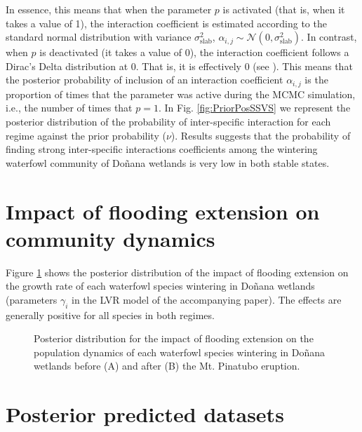 \documentclass[11pt]{article}
\begin{document}
{In essence, this means that when the parameter $p$ is activated (that is, when it takes a value of 1), the interaction coefficient is estimated according to the standard normal distribution with variance $\sigma^2_{\text{slab}}$, $\alpha_{i,j} \sim \mathcal{N} \left(0, \sigma^2_{\text{slab}} \right)$. In contrast, when $p$ is deactivated (it takes a value of 0), the interaction coefficient follows a Dirac's Delta distribution at 0. That is, it is effectively 0 (see \cite{Ishwaran2005}). This means that the posterior probability of inclusion of an interaction coefficient $\alpha_{i,j}$ is the proportion of times that the parameter was active during the MCMC simulation, i.e., the number of times that $p = 1$. In Fig. \ref{fig:PriorPosSSVS} we represent the posterior distribution of the probability of inter-specific interaction for each regime against the prior probability ($\nu$). Results suggests that the probability of finding strong inter-specific interactions coefficients among the wintering waterfowl community of Doñana wetlands is very low in both stable states.\\

\section{Impact of flooding extension on community dynamics}

Figure \ref{fig:FloodingImpact} shows the posterior distribution of the impact of flooding extension on the growth rate of each waterfowl species wintering in Doñana wetlands (parameters $\gamma_{i}$ in the LVR model of the accompanying paper). The effects are generally positive for all species in both regimes.\\

\renewcommand{\thefigure}{S2}
\begin{figure}[t]
	\centering
	\qquad
	\caption{Posterior distribution for the impact of flooding extension on the population dynamics of each waterfowl species wintering in Doñana wetlands before (A) and after (B) the Mt. Pinatubo eruption.}%
	\label{fig:FloodingImpact}%
\end{figure}

\section{Posterior predicted datasets}

}
\end{document}
